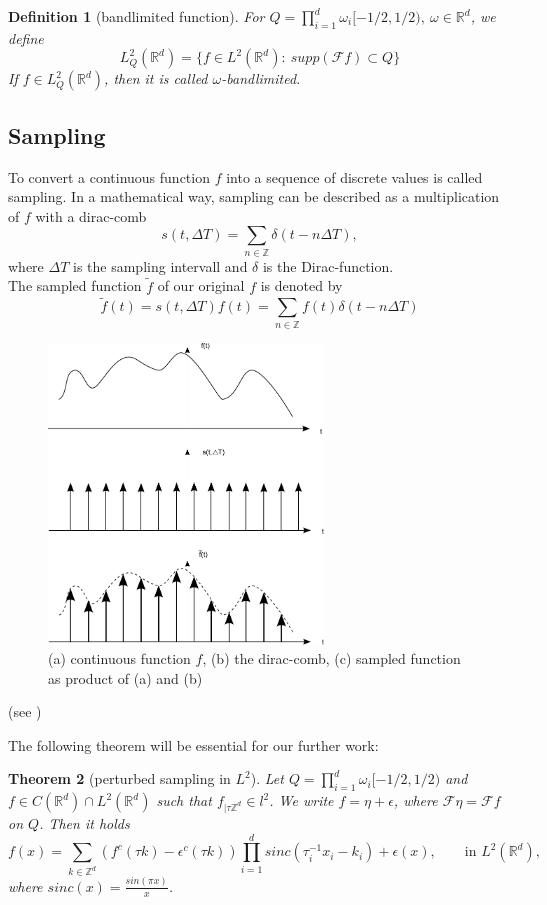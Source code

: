 \documentclass[a4paper, 11pt]{scrreprt}
\newtheorem{defi}{Definition}[section]
\newtheorem{theorem}[defi]{Theorem}
\newcommand{\RR}{\mathbb{R}}
\newcommand{\ZZ}{\mathbb{Z}}
\newcommand{\FF}{\mathcal{F}}
\begin{document}
\begin{defi}[bandlimited function]
	For \(Q = \prod_{i=1}^d \omega_i[-1/2, 1/2),\ \omega\in\RR^d\), we define
	\begin{equation}
		L_Q^2(\RR^d) = \{f\in L^2(\RR^d):\ supp(\FF f) \subset Q\}
	\end{equation}
	If \(f\in L_Q^2(\RR^d)\), then it is called \(\omega\)-bandlimited.
\end{defi}

\subsection{Sampling}
To convert a continuous function \(f\) into a sequence of discrete values is called sampling. In a mathematical way, sampling can be described as a multiplication of \(f\) with a dirac-comb 
\[s(t,\Delta T) = \sum_{n\in\ZZ} \delta(t-n\Delta T), \]
where \(\Delta T\) is the sampling intervall and \(\delta\) is the Dirac-function.\\
The sampled function \(\tilde{f}\) of our original \(f\) is denoted by
\begin{equation}
	\tilde{f} (t) = s(t,\Delta T) f(t) = \sum_{n\in\ZZ} f(t)\delta(t-n\Delta T)
\end{equation}
\begin{figure}[htpb]
	\centering
	\includegraphics[width=0.65\textwidth]{Sampling-Visualisierung.pdf}
	\caption{(a) continuous function \(f\), (b) the dirac-comb, (c) sampled function as product of (a) and (b)}
\end{figure}
(see \cite{marks02})

The following theorem will be essential for our further work:
\begin{theorem}[perturbed sampling in \(L^2\)]
\label{th:perturbed sampling}
Let \(Q = \prod_{i=1}^d \omega_i[-1/2, 1/2)\) and \\
 \({f\in C(\RR^d)\cap L^2(\RR^d)}\) such that \(f_{|\tau\ZZ^d} \in l^2\). We write \(f=\eta + \epsilon\), where \(\FF\eta = \FF f\) on \(Q\). Then it holds
\begin{equation}
	f(x) = \sum_{k\in\ZZ^d} (f^c(\tau k)-\epsilon^c(\tau k))\prod _{i=1}^d sinc(\tau_i^{-1}x_i-k_i)+\epsilon(x), \qquad \text{in } L^2(\RR^d),
\end{equation}
where \(sinc(x) = \frac{sin(\pi x)}{x}\).
\end{theorem}
\end{document}
